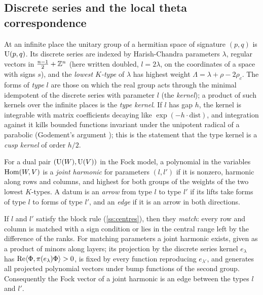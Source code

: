 \subsection{Discrete series and the local theta correspondence}\label{ss:B-discrete-series}
At an infinite place the unitary group of a hermitian space of signature $(p,q)$ is $\operatorname{U}(p,q)$. Its discrete series
are indexed by Harish-Chandra parameters $\lambda$, regular vectors in $\frac{n-1}2+\mathbb{Z}^n$ (here written doubled,
$l=2\lambda$, on the coordinates of a space with signs $s$), and the \emph{lowest $K$-type} of $\lambda$ has highest
weight $\Lambda=\lambda+\rho-2\rho_c$. The forms of \emph{type} $l$ are those on which the real group acts through
the minimal idempotent of the discrete series with parameter $l$ (the \emph{kernel}); a product of such kernels over
the infinite places is the \emph{type kernel}. If $l$ has gap $h$, the kernel is integrable with
matrix coefficients decaying like $\exp(-h\cdot\mathrm{dist})$, and integration against it kills bounded functions
invariant under the unipotent radical of a parabolic (Godement's argument \cite[Ch.~7]{Wallach1988}); this is the
statement that the type kernel is a \emph{cusp kernel} of order $h/2$.

For a dual pair $(\operatorname{U}(W),\operatorname{U}(V))$ in the Fock model, a polynomial in the variables $\operatorname{Hom}(W,V)$ is a \emph{joint
harmonic} for parameters $(l,l')$ if it is nonzero, harmonic along rows and columns, and highest for both groups of
the weights of the two lowest $K$-types. A datum is an \emph{arrow} from type $l$ to type $l'$ if its lifts take forms of
type $l$ to forms of type $l'$, and an \emph{edge} if it is an arrow in both directions.

\begin{theorem}\label{thm:B-theta-ds}
If $l$ and $l'$ satisfy the block rule (\cref{ss:centres}), then they \emph{match}: every row and column is matched
with a sign condition or lies in the central range left by the difference of the ranks. For matching parameters a
joint harmonic exists, given as a product of minors along layers; its projection by the discrete series kernel
$e_\lambda$ has $\operatorname{Re}\langle\Phi,\pi(e_\lambda)\Phi\rangle>0$, is fixed by every function reproducing $e_{\lambda'}$, and
generates all projected polynomial vectors under bump functions of the second group. Consequently the Fock vector of a
joint harmonic is an edge between the types $l$ and $l'$.
\end{theorem}

